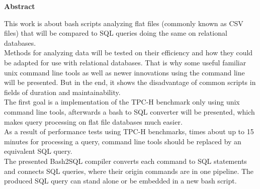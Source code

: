

\clearemptydoublepage
{}
{}	





\vspace*{2cm}
\begin{center}
{\Large \bf Abstract}
\end{center}
\vspace{1cm}

This work is about bash scripts analyzing flat files (commonly known as CSV files) that will be compared to SQL queries doing the same on relational databases.\\

Methods for analyzing data will be tested on their efficiency and how they could be a\-dap\-ted for use with relational databases.
That is why some useful familiar unix command line tools as well as newer innovations using the command line will be presented.
But in the end, it shows the disadvantage of common scripts in fields of duration and maintainability.\\

The first goal is a implementation of the TPC-H benchmark only using unix command line tools, afterwards a bash to SQL converter will be presented, which makes query processing on flat file databases much easier.\\

As a result of performance tests using TPC-H benchmarks, times about up to 15 minutes for processing a query, command line tools should be replaced by an equivalent SQL query.\\

The presented Bash2SQL compiler converts each command to SQL statements and con\-nects SQL queries, where their origin commands are in one pipeline. The produced SQL query can stand alone or be embedded in a new bash script.


